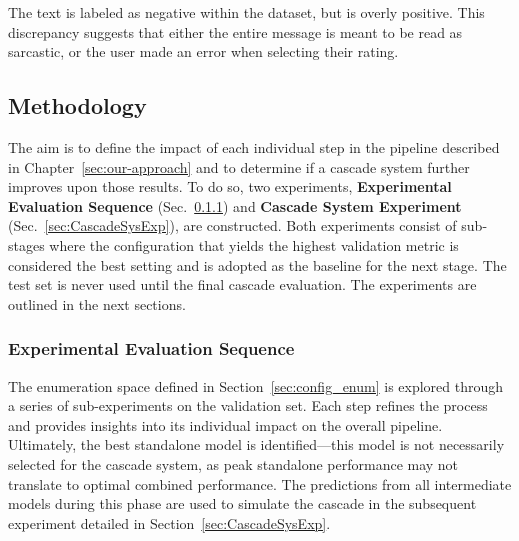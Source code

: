 \documentclass[a4paper,fleqn]{cas-dc}
\begin{document}
The text is labeled as negative within the dataset, but is overly positive. This discrepancy suggests that either the entire message is meant to be read as sarcastic, or the user made an error when selecting their rating.

\subsection{Methodology} \label{sec:methodology}

The aim is to define the impact of each individual step in the pipeline described in Chapter~\ref{sec:our-approach} and to determine if a cascade system further improves upon those results. To do so, two experiments, \textbf{Experimental Evaluation Sequence} (Sec.~\ref{sec:ExperimentalEvalSeq}) and \textbf{Cascade System Experiment} (Sec.~\ref{sec:CascadeSysExp}), are constructed. Both experiments consist of sub-stages where the configuration that yields the highest validation metric is considered the best setting and is adopted as the baseline for the next stage. The test set is never used until the final cascade evaluation. The experiments are outlined in the next sections.

\subsubsection{Experimental Evaluation Sequence} \label{sec:ExperimentalEvalSeq}

The enumeration space defined in Section~\ref{sec:config_enum} is explored through a series of sub-experiments on the validation set. Each step refines the process and provides insights into its individual impact on the overall pipeline. Ultimately, the best standalone model is identified---this model is not necessarily selected for the cascade system, as peak standalone performance may not translate to optimal combined performance. The predictions from all intermediate models during this phase are used to simulate the cascade in the subsequent experiment detailed in Section~\ref{sec:CascadeSysExp}.
\end{document}
